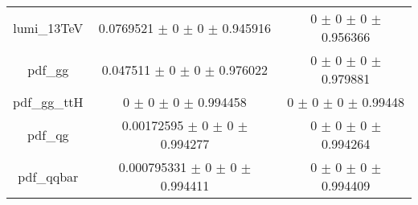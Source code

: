 \begin{table}
\begin{tabular}{ccc}
lumi\_13TeV & \num{0.0769521} $\pm$ \num{0} $\pm$ \num{0} $\pm$ \num{0.945916} & \num{0} $\pm$ \num{0} $\pm$ \num{0} $\pm$ \num{0.956366}\\
pdf\_gg & \num{0.047511} $\pm$ \num{0} $\pm$ \num{0} $\pm$ \num{0.976022} & \num{0} $\pm$ \num{0} $\pm$ \num{0} $\pm$ \num{0.979881}\\
pdf\_gg\_ttH & \num{0} $\pm$ \num{0} $\pm$ \num{0} $\pm$ \num{0.994458} & \num{0} $\pm$ \num{0} $\pm$ \num{0} $\pm$ \num{0.99448}\\
pdf\_qg & \num{0.00172595} $\pm$ \num{0} $\pm$ \num{0} $\pm$ \num{0.994277} & \num{0} $\pm$ \num{0} $\pm$ \num{0} $\pm$ \num{0.994264}\\
pdf\_qqbar & \num{0.000795331} $\pm$ \num{0} $\pm$ \num{0} $\pm$ \num{0.994411} & \num{0} $\pm$ \num{0} $\pm$ \num{0} $\pm$ \num{0.994409}\\
\bottomrule
\end{tabular}
\end{table}